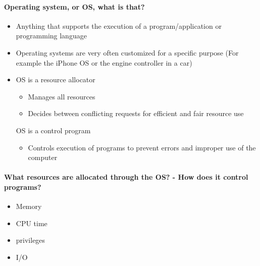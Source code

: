 
\paragraph{Operating system, or OS, what is that?}

\begin{itemize}
\item Anything that supports the execution of a program/application or programming language
\item Operating systems are very often customized for a specific purpose (For example the iPhone OS or the engine controller in a car)
\item
  OS is a resource allocator
  \begin{itemize}
    \item Manages all resources
    \item Decides between conflicting requests for efficient and fair resource use
  \end{itemize}

  OS is a control program
  \begin{itemize}
    \item Controls execution of programs to prevent errors and improper use of the computer
  \end{itemize}
\end{itemize}

\paragraph{What resources are allocated through the OS? - How does it control programs?}

\begin{itemize}
\item Memory
\item CPU time
\item privileges
\item I/O
\end{itemize}
